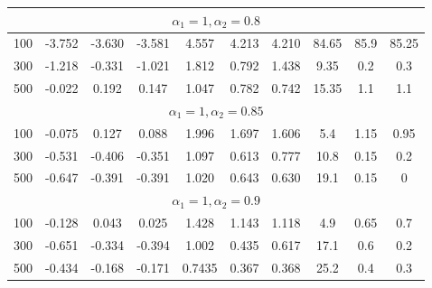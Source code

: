 \begin{table}[!hbt]
\begin{tabular}{lccccccccc}
\multicolumn{10}{c}{$\alpha _1= 1, \alpha_2 = 0.8$}                                                                                                                              \\ \hline
\multicolumn{1}{l|}{100}                & -3.752 & -3.630 & \multicolumn{1}{c|}{-3.581} & 4.557  & 4.213 & \multicolumn{1}{c|}{4.210} & 84.65       & 85.9       & 85.25       \\
\multicolumn{1}{l|}{300}                & -1.218 & -0.331 & \multicolumn{1}{c|}{-1.021} & 1.812  & 0.792 & \multicolumn{1}{c|}{1.438} & 9.35        & 0.2        & 0.3         \\
\multicolumn{1}{l|}{500}                & -0.022 & 0.192  & \multicolumn{1}{c|}{0.147}  & 1.047  & 0.782 & \multicolumn{1}{c|}{0.742} & 15.35       & 1.1        & 1.1         \\ \hline
\multicolumn{10}{c}{$\alpha_1 = 1, \alpha_2 = 0.85$}                                                                                                                             \\ \hline
\multicolumn{1}{l|}{100}                & -0.075 & 0.127  & \multicolumn{1}{c|}{0.088}  & 1.996  & 1.697 & \multicolumn{1}{c|}{1.606} & 5.4         & 1.15       & 0.95        \\
\multicolumn{1}{l|}{300}                & -0.531 & -0.406 & \multicolumn{1}{c|}{-0.351} & 1.097  & 0.613 & \multicolumn{1}{c|}{0.777} & 10.8        & 0.15       & 0.2         \\
\multicolumn{1}{l|}{500}                & -0.647 & -0.391 & \multicolumn{1}{c|}{-0.391} & 1.020  & 0.643 & \multicolumn{1}{c|}{0.630} & 19.1        & 0.15       & 0           \\ \hline
\multicolumn{10}{c}{$\alpha_1 = 1, \alpha_2 = 0.9$}                                                                                                                              \\ \hline
\multicolumn{1}{l|}{100}                & -0.128 & 0.043  & \multicolumn{1}{c|}{0.025}  & 1.428  & 1.143 & \multicolumn{1}{c|}{1.118} & 4.9         & 0.65       & 0.7         \\
\multicolumn{1}{l|}{300}                & -0.651 & -0.334 & \multicolumn{1}{c|}{-0.394} & 1.002  & 0.435 & \multicolumn{1}{c|}{0.617} & 17.1        & 0.6        & 0.2         \\
\multicolumn{1}{l|}{500}                & -0.434 & -0.168 & \multicolumn{1}{c|}{-0.171} & 0.7435 & 0.367 & \multicolumn{1}{c|}{0.368} & 25.2        & 0.4        & 0.3         \\ \hline

\end{tabular}
\end{table}
